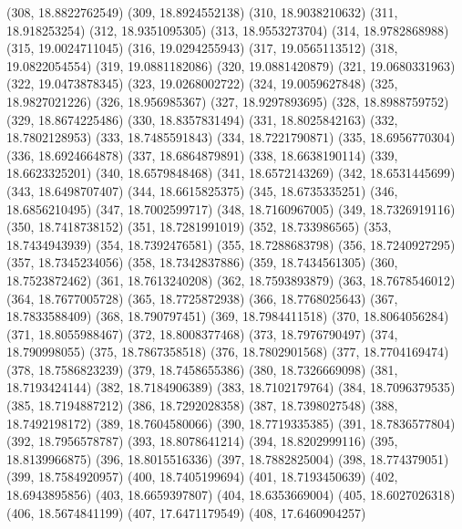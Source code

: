 {					(308, 18.8822762549)
					(309, 18.8924552138)
					(310, 18.9038210632)
					(311, 18.918253254)
					(312, 18.9351095305)
					(313, 18.9553273704)
					(314, 18.9782868988)
					(315, 19.0024711045)
					(316, 19.0294255943)
					(317, 19.0565113512)
					(318, 19.0822054554)
					(319, 19.0881182086)
					(320, 19.0881420879)
					(321, 19.0680331963)
					(322, 19.0473878345)
					(323, 19.0268002722)
					(324, 19.0059627848)
					(325, 18.9827021226)
					(326, 18.956985367)
					(327, 18.9297893695)
					(328, 18.8988759752)
					(329, 18.8674225486)
					(330, 18.8357831494)
					(331, 18.8025842163)
					(332, 18.7802128953)
					(333, 18.7485591843)
					(334, 18.7221790871)
					(335, 18.6956770304)
					(336, 18.6924664878)
					(337, 18.6864879891)
					(338, 18.6638190114)
					(339, 18.6623325201)
					(340, 18.6579848468)
					(341, 18.6572143269)
					(342, 18.6531445699)
					(343, 18.6498707407)
					(344, 18.6615825375)
					(345, 18.6735335251)
					(346, 18.6856210495)
					(347, 18.7002599717)
					(348, 18.7160967005)
					(349, 18.7326919116)
					(350, 18.7418738152)
					(351, 18.7281991019)
					(352, 18.733986565)
					(353, 18.7434943939)
					(354, 18.7392476581)
					(355, 18.7288683798)
					(356, 18.7240927295)
					(357, 18.7345234056)
					(358, 18.7342837886)
					(359, 18.7434561305)
					(360, 18.7523872462)
					(361, 18.7613240208)
					(362, 18.7593893879)
					(363, 18.7678546012)
					(364, 18.7677005728)
					(365, 18.7725872938)
					(366, 18.7768025643)
					(367, 18.7833588409)
					(368, 18.790797451)
					(369, 18.7984411518)
					(370, 18.8064056284)
					(371, 18.8055988467)
					(372, 18.8008377468)
					(373, 18.7976790497)
					(374, 18.790998055)
					(375, 18.7867358518)
					(376, 18.7802901568)
					(377, 18.7704169474)
					(378, 18.7586823239)
					(379, 18.7458655386)
					(380, 18.7326669098)
					(381, 18.7193424144)
					(382, 18.7184906389)
					(383, 18.7102179764)
					(384, 18.7096379535)
					(385, 18.7194887212)
					(386, 18.7292028358)
					(387, 18.7398027548)
					(388, 18.7492198172)
					(389, 18.7604580066)
					(390, 18.7719335385)
					(391, 18.7836577804)
					(392, 18.7956578787)
					(393, 18.8078641214)
					(394, 18.8202999116)
					(395, 18.8139966875)
					(396, 18.8015516336)
					(397, 18.7882825004)
					(398, 18.774379051)
					(399, 18.7584920957)
					(400, 18.7405199694)
					(401, 18.7193450639)
					(402, 18.6943895856)
					(403, 18.6659397807)
					(404, 18.6353669004)
					(405, 18.6027026318)
					(406, 18.5674841199)
					(407, 17.6471179549)
					(408, 17.6460904257)
}
